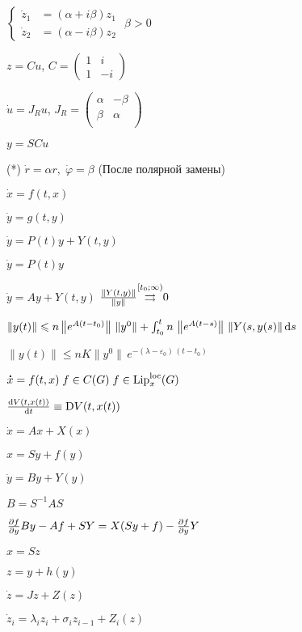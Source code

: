 \documentclass[timbord]{longnotes}
\DeclareMathOperator\Lip{Lip}
\def\Liploc{\Lip^{\rm loc}}
\begin{document}
\begin{list}
    $\left\{ 
      \begin{aligned}
        \dot z_1 &= (\alpha + i \beta)z_1 \\ \dot z_2 &= (\alpha - i \beta)z_2 
      \end{aligned}
    \right.$ \hfill $\beta >0$ 
  \item $z = Cu$, $C = \begin{pmatrix} 1&i\\1 & -i \end{pmatrix}$
  \item $\dot u = J_R u$, $J_R = 
    \begin{pmatrix}
      \alpha & -\beta \\
      \beta &  \alpha \\
    \end{pmatrix}$
  \item $y = SC u$
  \item[(*)] $\dot r = \alpha r, \; \dot\varphi  = \beta $ \hfill(После полярной замены)
    \nch
  \item $\dot x = f(t,x)$
  \item $\dot y = g(t,y)$
  \item $\dot y = P(t) y + Y(t,y)$
  \item $\dot y = P(t)y$
  \item $\dot y = Ay + Y(t,y)$ \hfill $\frac{\|Y(t,y)\|}{\|y\|} \overset{[t_0;\infty)}{\mathop{\rightrightarrows}\limits} 0 $
  \item $\|y(t)\| \leqslant n \left\|e^{A(t-t_0)}\right\|\, \|y^0\| + 
    \int_{t_0}^t n \, \left\|e^{A(t-s)}\right\| \, \|Y(s,y(s)\|\, \mathrm{d} s$
  \item $\|y(t)\| \leqslant n K \|y^0\|\, e^{-(\lambda- \varepsilon_0) \, (t-t_0)}$
    \skeq[3]
  \item $\dot x =f(t,x) \; f \in C(G) \; f \in \Liploc_x(G)$
  \item $\fder{V(t,x(t))}{t} \equiv \mathrm D V(t,x(t))$ 
    \nch
  \item $\dot x = Ax + X(x)$
  \item $x= Sy+f(y)$
  \item $\dot y = By + Y(y)$
  \item $B =  S^{-1} A S$
  \item $\pder fy B y - Af + SY = X(Sy + f) - \pder{f}{y} Y$
  \item $x = Sz$
  \item $z = y + h(y)$
  \item $\dot z= Jz+Z(z)$
  \item $\dot z_i = \lambda_i z_i + \sigma_i z_{i-1} + Z_i(z)$

\end{list}
\end{document}
